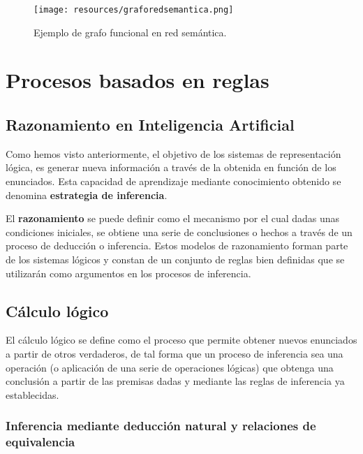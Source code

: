\documentclass[a4paper, 11pt, titlepage]{article}
\begin{document}
        \begin{figure}[htp]
            \centering
            \texttt{[image: resources/graforedsemantica.png]}
            \caption{Ejemplo de grafo funcional en red semántica.}
            \label{graforedsemantica}
        \end{figure}    

\section{Procesos basados en reglas}

    \subsection{Razonamiento en Inteligencia Artificial}

        Como hemos visto anteriormente, el objetivo de los sistemas de representación lógica, es 
        generar nueva información a través de la obtenida en función de los enunciados. Esta capacidad 
        de aprendizaje mediante conocimiento obtenido se denomina \textbf{estrategia de inferencia}.

        El \textbf{razonamiento} se puede definir como el mecanismo por el cual dadas unas 
        condiciones iniciales, se obtiene una serie de conclusiones o hechos a través de un proceso 
        de deducción o inferencia. Estos modelos de razonamiento forman parte de los sistemas 
        lógicos y constan de un conjunto de reglas bien definidas que se utilizarán como argumentos 
        en los procesos de inferencia.

    \subsection{Cálculo lógico}\label{calculologico}

        El cálculo lógico se define como el proceso que permite obtener nuevos enunciados a 
        partir de otros verdaderos, de tal forma que un proceso de inferencia sea una operación (o 
        aplicación de una serie de operaciones lógicas) que obtenga una conclusión a partir de las 
        premisas dadas y mediante las reglas de inferencia ya establecidas.

        \subsubsection{Inferencia mediante deducción natural y relaciones de equivalencia}
\end{document}
